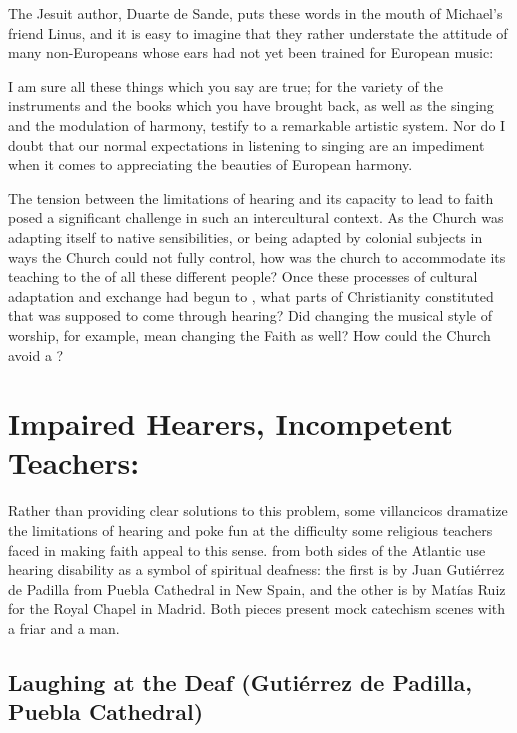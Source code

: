 The Jesuit author, Duarte de Sande, puts these words in the mouth of Michael's
friend Linus, and it is easy to imagine that they rather understate the attitude
of many non-Europeans whose ears had not yet been trained for European music:
\begin{quoting}
    I am sure all these things which you say are true; for the variety of the
    instruments and the books which you have brought back, as well as the
    singing and the modulation of harmony, testify to a remarkable artistic
    system.
    Nor do I doubt that our normal expectations in listening to singing are an
    impediment when it comes to appreciating the beauties of European harmony.%
        \Autocite[156]{Massarella:JapaneseTravellers}
\end{quoting}

The tension between the limitations of hearing and its capacity to lead to
faith posed a significant challenge in such an intercultural context.
As the Church was adapting itself to native sensibilities, or being adapted by
colonial subjects in ways the Church could not fully control, how was the church
to accommodate its teaching to the  of all these
different people?
Once these processes of cultural adaptation and exchange had begun to
, what parts of Christianity constituted  that
was supposed to come through hearing?
Did changing the musical style of worship, for example, mean changing the Faith
as well?
How could the Church avoid a ?


\section{Impaired Hearers, Incompetent Teachers: 
}

Rather than providing clear solutions to this problem, some villancicos
dramatize the limitations of hearing and poke fun at the difficulty some
religious teachers faced in making faith appeal to this sense.
 from both sides of the Atlantic use hearing
disability as a symbol of spiritual deafness: the first is by Juan Gutiérrez de
Padilla from Puebla Cathedral in New Spain, and the other is by Matías Ruiz for
the Royal Chapel in Madrid.
Both pieces present mock catechism scenes with a friar and a  man.

\subsection{Laughing at the Deaf (Gutiérrez de Padilla, Puebla Cathedral)}

